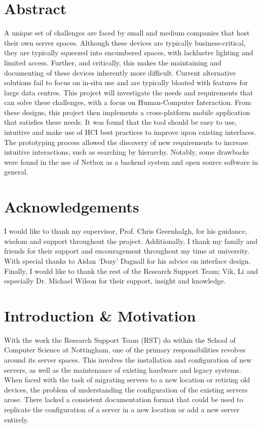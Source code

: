 \documentclass [11pt,a4paper]{article}
\begin{document}
\section*{Abstract}
    \noindent
    A unique set of challenges are faced by small and medium companies that host their own server spaces. Although these devices are typically business-critical, they are typically squeezed into encumbered spaces, with lacklustre lighting and limited access. Further, and critically, this makes the maintaining and documenting of these devices inherently more difficult. Current alternative solutions fail to focus on in-situ use and are typically bloated with features for large data centres. This project will investigate the needs and requirements that can solve these challenges, with a focus on Human-Computer Interaction. From these designs, this project then implements a cross-platform mobile application that satisfies these needs. It was found that the tool should be easy to use, intuitive and make use of HCI best practices to improve upon existing interfaces. The prototyping process allowed the discovery of new requirements to increase intuitive interactions, such as searching by hierarchy. Notably, some drawbacks were found in the use of Netbox as a backend system and open source software in general.  


\section*{Acknowledgements}
    \noindent
    I would like to thank my supervisor, Prof. Chris Greenhalgh, for his guidance, wisdom and support throughout the project. Additionally, I thank my family and friends for their support and encouragement throughout my time at university. With special thanks to Aidan `Dozy' Dagnall for his advice on interface design.
    Finally, I would like to thank the rest of the Research Support Team; Vik, Li and especially Dr. Michael Wilson for their support, insight and knowledge.
\pagebreak

\tableofcontents
\pagebreak 
{}    

\setlength{\parskip}{2ex}

\section{Introduction \& Motivation}
\label{sec:introduction}
With the work the Research Support Team (RST) do within the School of Computer Science at Nottingham, one of the primary responsibilities revolves around its server spaces. This involves the installation and configuration of new servers, as well as the maintenance of existing hardware and legacy systems. When faced with the task of migrating servers to a new location or retiring old devices, the problem of understanding the configuration of the existing servers arose. There lacked a consistent documentation format that could be used to replicate the configuration of a server in a new location or add a new server entirely.
\end{document}
